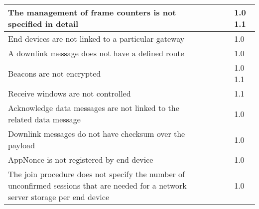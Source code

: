 \documentclass[manuscript,screen,review=false]{acmart}
\begin{document}
\begin{table}[!ht]
\begin{tabular}{p{}|p{}|p{}|p{}|p{}}
    The management of frame counters is not specified in detail
    & \cite{03_security_LoRaWANv1.1_scenarios} \cite{32_security_vulnerabilities_LoRa}   \cite{59_IoT_security_overview_practical_demonstration} 
    \cite{77_security_survey}
    & \cite{32_security_vulnerabilities_LoRa}  
    & \cite{59_IoT_security_overview_practical_demonstration} 
    & 1.0 1.1  \\ \hline 

    End devices are not linked to a particular gateway
    & \cite{16_privacy_ioT_networks} 
    & \cite{16_privacy_ioT_networks} 
    &  
    & 1.0 \\ \hline
    
    A downlink message does not have a defined route
    & \cite{23_lora_secure_design}
    \cite{92_DoS_lorawan}
    & \cite{23_lora_secure_design}
    \cite{92_DoS_lorawan}
    &  \cite{92_DoS_lorawan}
    & 1.0 \\ \hline
    
    Beacons are not encrypted  
    & \cite{37_security_vulnerabilities_lorawan} 
    \cite{92_DoS_lorawan}   
    & \cite{37_security_vulnerabilities_lorawan}  
    \cite{92_DoS_lorawan} 
    & \cite{92_DoS_lorawan} 
    & 1.0 1.1 \\ \hline
    
    Receive windows are not controlled 
    & \cite{99_energy_attack} 
    &
    & \cite{99_energy_attack} 
    & 1.1 \\ \hline
    
    Acknowledge data messages are not linked to the related data message  
    & \cite{03_security_LoRaWANv1.1_scenarios} \cite{37_security_vulnerabilities_lorawan} \cite{59_IoT_security_overview_practical_demonstration} 
    & \cite{37_security_vulnerabilities_lorawan}
    & \cite{37_security_vulnerabilities_lorawan}
    & 1.0 \\ \hline
    
    Downlink messages do not have checksum over the payload  
    & \cite{70_low_throughput_networks_IoT} 
    &         
    &  
    & 1.0 \\ \hline
    
    AppNonce is not registered by end device 
    & \cite{03_security_LoRaWANv1.1_scenarios}  \cite{35_third_party_key_management} \cite{98_lorawan_framework_smarthome} 
    & \cite{98_lorawan_framework_smarthome} 
    & 
    & 1.0 \\ \hline
    
    The join procedure does not specify the number of unconfirmed sessions that are needed for a network server storage per end device 
    & \cite{03_security_LoRaWANv1.1_scenarios} 
    &  
    & 
    & 1.0 \\ \hline


\end{tabular}
\end{table}
\end{document}
